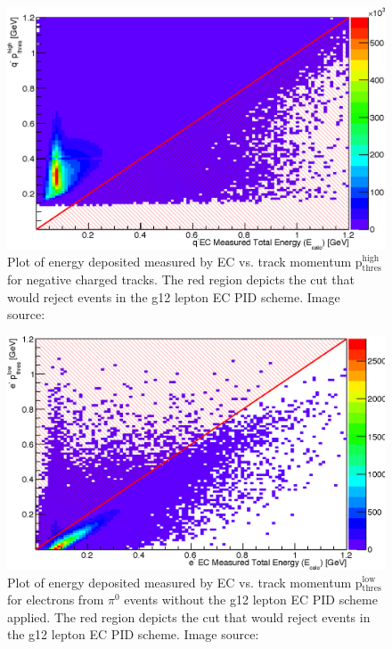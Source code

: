 \begin{figure}\begin{center}
					\includegraphics[width=0.8\figwidth]{figures/lepton/Pim_EChigh.eps}
					\caption[EC Deposited Energy Comparison to Upper Threshold Track Momentum for q$^-$ Tracks]{\label{fig:islep.pimEChigh}Plot of energy deposited measured by EC vs. track momentum p$\mathrm{_{thres}^{high}}$ for negative charged tracks. The red region depicts the cut that would reject events in the g12 lepton EC PID scheme. Image source:~\cite{thesiskunkel}}
\end{center}\end{figure}
				
				
\begin{figure}\begin{center}
						\includegraphics[width=0.8\figwidth]{figures/lepton/Pim_EClowcut.eps}
						\caption[EC Deposited Energy Comparison to Track Momentum for $e^-$ Candidates]{\label{fig:islep.pimEC}Plot of energy deposited measured by EC vs. track momentum p$\mathrm{_{thres}^{low}}$ for electrons from $\pi^0$ events without the g12 lepton EC PID scheme applied. The red region depicts the cut that would reject events in the g12 lepton EC PID scheme. Image source:~\cite{thesiskunkel}}
\end{center}\end{figure}
					
